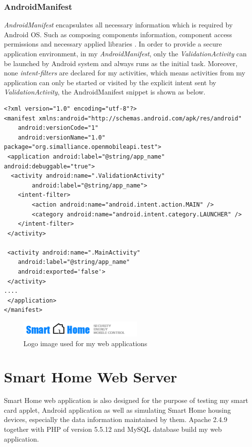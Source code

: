 \subsubsection{AndroidManifest}
\emph{AndroidManifest} encapsulates all necessary information which is required by Android OS. Such as composing components information, component access permissions and necessary applied libraries \cite{android_manifest}. In order to provide a secure application environment, in my \emph{AndroidManifest}, only the \emph{ValidationActivity} can be launched by Android system and always runs as the initial task. Moreover, none \emph{intent-filters} are declared for my activities, which means activities from my application can only be started or visited by the explicit intent sent by \emph{ValidationActivity}, the AndroidManifest snippet is shown as below.
\begin{Verbatim}[fontsize=\relsize{-1},frame=lines,framesep=4mm, label=\fbox{\small\emph{AndroidManifest.xml}}]
<?xml version="1.0" encoding="utf-8"?>
<manifest xmlns:android="http://schemas.android.com/apk/res/android"
	android:versionCode="1"
	android:versionName="1.0" package="org.simalliance.openmobileapi.test">
 <application android:label="@string/app_name" android:debuggable="true">
  <activity android:name=".ValidationActivity"
 		android:label="@string/app_name">
	<intent-filter>
		<action android:name="android.intent.action.MAIN" />
		<category android:name="android.intent.category.LAUNCHER" />
	</intent-filter>
 </activity>
      
 <activity android:name=".MainActivity"
	android:label="@string/app_name"
	android:exported='false'>
 </activity>
....
 </application>
</manifest> 
\end{Verbatim}



\begin{figure}[!htb]
	\centering
	\includegraphics[width=0.55\textwidth]{logo.png}
		\caption{Logo image used for my web applications}
	\label{fig:logo}
\end{figure}

\section{Smart Home Web Server} \label{secWEB}
Smart Home web application is also designed for the purpose of testing my smart card applet, Android application as well as simulating Smart Home housing devices, especially the data information maintained by them. Apache 2.4.9 together with PHP of version 5.5.12 and MySQL database build my web application.  


